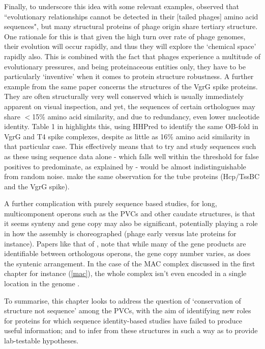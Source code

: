 Finally, to underscore this idea with some relevant examples, \cite{Leiman2010} observed that ``evolutionary relationships cannot be detected in their [tailed phages] amino acid sequences", but many structural proteins of phage origin share tertiary structure. One rationale for this is that given the high turn over rate of phage genomes, their evolution will occur rapidly, and thus they will explore the `chemical space' rapidly also. This is combined with the fact that phages experience a multitude of evolutionary pressures, and being proteinaceous entities only, they have to be particularly `inventive' when it comes to protein structure robustness. A further example from the same paper concerns the structures of the VgrG spike proteins. They are often structurally very well conserved which is usually immediately apparent on visual inspection, and yet, the sequences of certain orthologues may share $<$15\% amino acid similarity, and due to redundancy, even lower nucleotide identity. Table 1 in \cite{Browning2012} highlights this, using HHPred to identify the same OB-fold in VgrG and T4 spike complexes, despite as little as 16\% amino acid similarity in that particular case. This effectively means that to try and study sequences such as these using sequence data alone - which falls well within the threshold for false positives to predominate, as explained by \cite{rost1999twilight} - would be almost indistinguishable from random noise. \cite{Silverman2012} make the same observation for the tube proteins (Hcp/TssBC and the VgrG spike).

A further complication with purely sequence based studies, for long, multicomponent operons such as the PVCs and other caudate structures, is that it seems synteny and gene copy may also be significant, potentially playing a role in how the assembly is choreographed (phage early versus late proteins for instance). Papers like that of \cite{Sarris2014}, note that while many of the gene products are identifiable between orthologous operons, the gene copy number varies, as does the syntenic arrangement. In the case of the MAC complex discussed in the first chapter for instance (\vref{mac}), the whole complex isn't even encoded in a single location in the genome \citep{Shikuma2014}. 


To summarise, this chapter looks to address the question of `conservation of structure not sequence' among the PVCs, with the aim of identifying new roles for proteins for which sequence identity-based studies have failed to produce useful information; and to infer from these structures in such a way as to provide lab-testable hypotheses.

